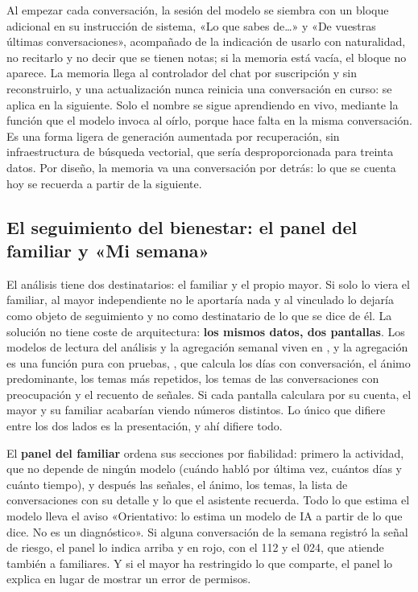 Al empezar cada conversación, la sesión del modelo se siembra con un bloque adicional en su instrucción de
sistema, «Lo que sabes de\ldots» y «De vuestras últimas conversaciones», acompañado de la indicación de
usarlo con naturalidad, no recitarlo y no decir que se tienen notas; si la memoria está vacía, el bloque no
aparece. La memoria llega al controlador del chat por suscripción y sin reconstruirlo, y una actualización
nunca reinicia una conversación en curso: se aplica en la siguiente. Solo el nombre se sigue aprendiendo en
vivo, mediante la función que el modelo invoca al oírlo, porque hace falta en la misma conversación. Es una
forma ligera de generación aumentada por recuperación, sin infraestructura de búsqueda vectorial, que sería
desproporcionada para treinta datos. Por diseño, la memoria va una conversación por detrás: lo que se
cuenta hoy se recuerda a partir de la siguiente.

\subsection{El seguimiento del bienestar: el panel del familiar y «Mi semana»}
\label{sec:bienestar}

El análisis tiene dos destinatarios: el familiar y el propio mayor. Si solo lo viera el familiar, al mayor
independiente no le aportaría nada y al vinculado lo dejaría como objeto de seguimiento y no como
destinatario de lo que se dice de él. La solución no tiene coste de arquitectura: \textbf{los mismos datos,
dos pantallas}. Los modelos de lectura del análisis y la agregación semanal viven en , y la
agregación es una función pura con pruebas, , que calcula los días con conversación, el
ánimo predominante, los temas más repetidos, los temas de las conversaciones con preocupación y el recuento
de señales. Si cada pantalla calculara por su cuenta, el mayor y su familiar acabarían viendo números
distintos. Lo único que difiere entre los dos lados es la presentación, y ahí difiere todo.

El \textbf{panel del familiar} ordena sus secciones por fiabilidad: primero la actividad, que no depende de
ningún modelo (cuándo habló por última vez, cuántos días y cuánto tiempo), y después las señales, el ánimo,
los temas, la lista de conversaciones con su detalle y lo que el asistente recuerda. Todo lo que estima el
modelo lleva el aviso «Orientativo: lo estima un modelo de IA a partir de lo que dice. No es un
diagnóstico». Si alguna conversación de la semana registró la señal de riesgo, el panel lo indica arriba y en
rojo, con el 112 y el 024, que atiende también a familiares. Y si el mayor ha restringido lo que comparte, el
panel lo explica en lugar de mostrar un error de permisos.

